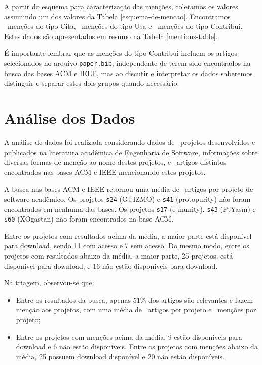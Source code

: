 A partir do esquema para caracterização das menções, coletamos os valores
assumindo um dos valores da Tabela \ref{esquema-de-mencao}. Encontramos
\CiteCount \ menções do tipo Cita, \UseCount \ menções do tipo Usa e
\ContributeCount \ menções do tipo Contribui. Estes dados são
apresentados em resumo na Tabela \ref{mentions-table}.



É importante lembrar que as menções do tipo Contribui incluem os artigos
selecionados no arquivo \texttt{paper.bib}, independente de terem sido
encontrados na busca das bases ACM e IEEE, mas ao discutir e interpretar os
dados saberemos distinguir e separar estes dois grupos quando necessário.


\section{Análise dos Dados} \label{estudo2:analise} %

A análise de dados foi realizada considerando
dados de \SoftwareCount \ projetos desenvolvidos e publicados na literatura
acadêmica de Engenharia de Software, informações sobre diversas formas de
menção ao nome destes projetos, e \ScreeningUniqueCount \ artigos distintos
encontrados nas bases ACM e IEEE mencionando estes projetos.

A busca nas bases ACM e IEEE retornou uma média de \SearchUniqueMean \ artigos
por projeto de software acadêmico. 
Os projetos \texttt{s24} (GUIZMO) e \texttt{s41} (protopurity)
não foram encontrados em nenhuma das bases.
Os projetos \texttt{s17} (e-munity), \texttt{s43} (PtYasm) e \texttt{s60} (XOgastan)
não foram encontrados na base ACM.

Entre os projetos com resultados acima da média, 
a maior parte está disponível para download, 
sendo 11 com acesso e 7 sem acesso.  
Do mesmo modo, entre os projetos com resultados abaixo da média, 
a maior parte, 25 projetos, está disponível para download, 
e 16 não estão disponíveis para download.

Na triagem, observou-se que:

\begin{itemize}
  \item Entre os resultados da busca, apenas 51\% dos artigos são relevantes e
    fazem menção aos projetos, com uma média de \ScreeningUniqueMean \ artigos
    por projeto e \ScreeningMean \ menções por projeto;
  \item Entre os projetos com menções acima da média, 9 estão disponíveis para
    download e 6 não estão disponíveis. Entre os projetos com menções abaixo da
    média, 25 possuem download disponível e 20 não estão disponíveis.
\end{itemize}

